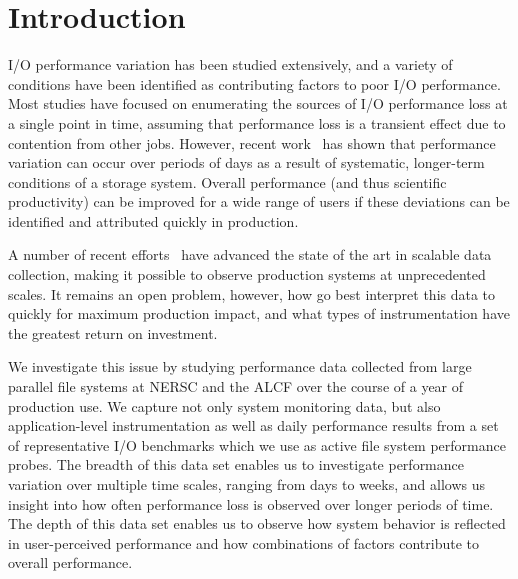 \section{Introduction}

I/O performance variation has been studied extensively, and a variety of conditions have been identified as contributing factors to poor I/O performance.  Most studies have focused on enumerating the sources of I/O performance loss at a single point in time, assuming that performance loss is a transient effect due to contention from other jobs.  However, recent work~\cite{Lockwood2017} has shown that performance variation can occur over periods of days as a result of systematic, longer-term conditions of a storage system.
%
Overall performance (and thus scientific productivity) can be improved for a
wide range of users if these deviations can be identified and attributed
quickly in production.


A number of recent efforts~\cite{Lockwood2017,Vazhkudai2017guide,Agelastos2014ldms,Kunkel2014siox} have advanced the
state of the art in scalable data collection, making it possible to observe
production systems at unprecedented scales.  It remains an open problem,
however, how go best interpret this data to quickly for maximum production
impact, and what types of instrumentation have the greatest return on
investment.

We investigate this issue by studying performance data collected from
large parallel file systems at NERSC and the ALCF over the course of
a year of production use.  We capture not only system monitoring data, but also
application-level instrumentation as well as daily performance results from a set of representative I/O benchmarks which we use as active file system performance probes. The breadth of
this data set enables us to investigate performance variation over
multiple time scales, ranging from days to weeks, and allows us insight
into how often performance loss is observed over longer periods of time.
The depth of this data set enables us to observe how system behavior is
reflected in user-perceived performance and how combinations of factors
contribute to overall performance.

